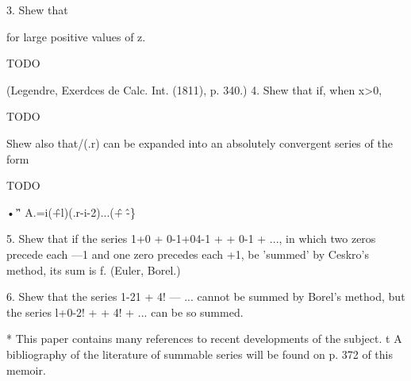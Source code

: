 3. Shew that 



for large positive values of z. 

TODO

(Legendre, Exerdces de Calc. Int. (1811), p. 340.) 
4. Shew that if, when x>0, 

TODO

Shew also that/(.r) can be expanded into an absolutely convergent series of the form 

TODO

•'\^ ' A.=i(\^+l)(.r-i-2)...(\^ + \^-\} 

5. Shew that if the series 1+0 + 0-1+04-1 + + 0-1 + ..., in which two zeros 
precede each —1 and one zero precedes each +1, be 'summed' by Ceskro's method, 
its sum is f. (Euler, Borel.) 

6. Shew that the series 1-21 + 4! — ... cannot be summed by Borel's method, but the 
series l+0-2! + + 4! + ... can be so summed. 

* This paper contains many references to recent developments of the subject. 
t A bibliography of the literature of summable series will be found on p. 372 of this 
memoir. 